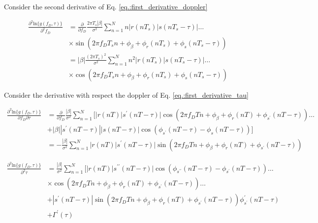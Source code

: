 \documentclass[12pt,a4paper,twoside,english]{article}
\begin{document}
Consider the second derivative of Eq. \eqref{eq.:first_derivative_doppler}

\begin{align} \label{eq.:second_derivative_doppler}
  \frac{\partial ^2 \textrm{ln}\{g(f_D,\tau)\} }{\partial ^2 f_D} & =  \frac{\partial }{\partial  f_D}\frac{2\pi T_s |\beta|}{\sigma ^2} \sum_{n=1}^{N} n|r(nT_s)|s(nT_s - \tau)| \ldots \nonumber \\
                                                                  & \times \sin{(2\pi f_DT_s n + \phi_{\beta} + \phi_r(nT_s) + \phi_{s}(nT_s - \tau))}  \nonumber \\
                                                                  & = |\beta|\frac{(2\pi T_s)^2}{\sigma ^2}\sum_{n=1}^{N} n^2|r(nT_s)|s(nT_s - \tau)| \ldots \nonumber \\
                                                                  & \times \cos{(2\pi f_DT_s n + \phi_{\beta} + \phi_r(nT_s) + \phi_{s}(nT_s - \tau))}
\end{align}

Consider the derivative with respect the doppler of Eq.
\eqref{eq.:first_derivative_tau}

\begin{align}
  \frac{\partial ^2 \textrm{ln}\{g(f_D,\tau)\} }{\partial  f_D \partial  \tau} & = \frac{\partial }{\partial  f_D} \frac{|\beta|}{\sigma ^{2}}\sum_{n=1}^{N}[|r(nT)|s^{\prime}(nT - \tau)| \cos{(2\pi f_DT n + \phi_{\beta} + \phi_r(nT) + \phi_{s^{\prime}}(nT - \tau))} \ldots \nonumber \\
                                                                               & + |\beta||s^{\prime}(nT - \tau)||s(nT - \tau)|\cos{(\phi_{s^{\prime}}(nT - \tau) - \phi_{s}(nT - \tau))}] \nonumber \\
                                                                               & = -\frac{|\beta|}{\sigma ^{2}}\sum_{n=1}^{N} |r(nT)|s^{\prime}(nT - \tau)| \sin{(2\pi f_DT n + \phi_{\beta} + \phi_r(nT) + \phi_{s^{\prime}}(nT - \tau))}
\end{align}


\begin{align}
  \frac{\partial ^2 \textrm{ln}\{g(f_D,\tau)\} }{\partial ^2  \tau}  & = \frac{|\beta|}{\sigma ^{2}}\sum_{n=1}^{N}[|r(nT) |s^{\prime \prime}(nT - \tau)|\cos{(\phi_{s^{\prime \prime}}(nT - \tau) - \phi_{s^{\prime}}(nT - \tau))} \ldots \nonumber \\
                                                                     & \times\cos{(2\pi f_DT n + \phi_{\beta} + \phi_r(nT) + \phi_{s^{\prime}}(nT - \tau))} \ldots \nonumber \\
                                                                     & +|s^{\prime}(nT - \tau)|\sin{(2\pi f_DT n + \phi_{\beta} + \phi_r(nT) + \phi_{s^{\prime}}(nT - \tau))}\phi^{\prime}_{s^{\prime}}(nT - \tau) \nonumber \\
  & + \Gamma ^{\prime}(\tau)
\end{align}
\end{document}
